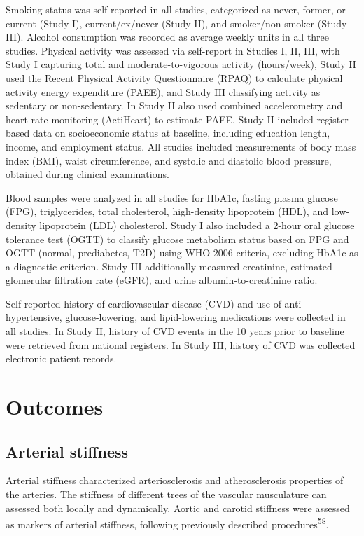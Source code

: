 \documentclass[
  a4paper,
  headsepline=true,
  open=any]{scrbook}
\begin{document}
Smoking status was self-reported in all studies, categorized as never,
former, or current (Study I), current/ex/never (Study II), and
smoker/non-smoker (Study III). Alcohol consumption was recorded as
average weekly units in all three studies. Physical activity was
assessed via self-report in Studies I, II, III, with Study I capturing
total and moderate-to-vigorous activity (hours/week), Study II used the
Recent Physical Activity Questionnaire (RPAQ) to calculate physical
activity energy expenditure (PAEE), and Study III classifying activity
as sedentary or non-sedentary. In Study II also used combined
accelerometry and heart rate monitoring (ActiHeart) to estimate PAEE.
Study II included register-based data on socioeconomic status at
baseline, including education length, income, and employment status. All
studies included measurements of body mass index (BMI), waist
circumference, and systolic and diastolic blood pressure, obtained
during clinical examinations.

Blood samples were analyzed in all studies for HbA1c, fasting plasma
glucose (FPG), triglycerides, total cholesterol, high-density
lipoprotein (HDL), and low-density lipoprotein (LDL) cholesterol. Study
I also included a 2-hour oral glucose tolerance test (OGTT) to classify
glucose metabolism status based on FPG and OGTT (normal, prediabetes,
T2D) using WHO 2006 criteria, excluding HbA1c as a diagnostic criterion.
Study III additionally measured creatinine, estimated glomerular
filtration rate (eGFR), and urine albumin-to-creatinine ratio.

Self-reported history of cardiovascular disease (CVD) and use of
anti-hypertensive, glucose-lowering, and lipid-lowering medications were
collected in all studies. In Study II, history of CVD events in the 10
years prior to baseline were retrieved from national registers. In Study
III, history of CVD was collected electronic patient records.

\hypertarget{outcomes}{%
\section{Outcomes}\label{outcomes}}

\hypertarget{arterial-stiffness}{%
\subsection{Arterial stiffness}\label{arterial-stiffness}}

Arterial stiffness characterized arteriosclerosis and atherosclerosis
properties of the arteries. The stiffness of different trees of the
vascular musculature can assessed both locally and dynamically. Aortic
and carotid stiffness were assessed as markers of arterial stiffness,
following previously described procedures\textsuperscript{58}.
\end{document}
